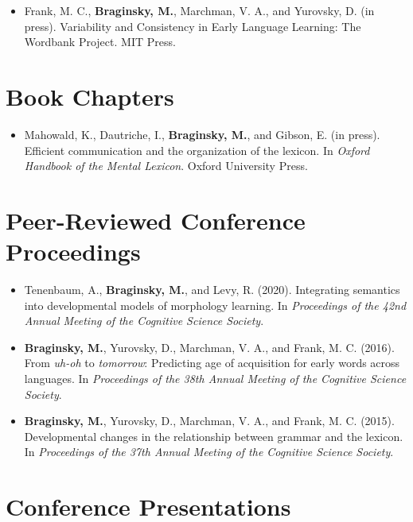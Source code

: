 \documentclass[11pt,]{article}
\providecommand{\tightlist}{%
  \setlength{\itemsep}{0pt}\setlength{\parskip}{0pt}}
\begin{document}
\begin{itemize}
\tightlist
\item
  Frank, M. C., \textbf{Braginsky, M.}, Marchman, V. A., and Yurovsky,
  D. (in press). Variability and Consistency in Early Language Learning:
  The Wordbank Project. MIT Press.
\end{itemize}

\hypertarget{book-chapters}{%
\section{Book Chapters}\label{book-chapters}}

\begin{itemize}
\tightlist
\item
  Mahowald, K., Dautriche, I., \textbf{Braginsky, M.}, and Gibson, E.
  (in press). Efficient communication and the organization of the
  lexicon. In \emph{Oxford Handbook of the Mental Lexicon}. Oxford
  University Press.
\end{itemize}

\hypertarget{peer-reviewed-conference-proceedings}{%
\section{Peer-Reviewed Conference
Proceedings}\label{peer-reviewed-conference-proceedings}}

\begin{itemize}
\item
  Tenenbaum, A., \textbf{Braginsky, M.}, and Levy, R. (2020).
  Integrating semantics into developmental models of morphology
  learning. In \emph{Proceedings of the 42nd Annual Meeting of the
  Cognitive Science Society}.
\item
  \textbf{Braginsky, M.}, Yurovsky, D., Marchman, V. A., and Frank, M.
  C. (2016). From \emph{uh-oh} to \emph{tomorrow}: Predicting age of
  acquisition for early words across languages. In \emph{Proceedings of
  the 38th Annual Meeting of the Cognitive Science Society}.
\item
  \textbf{Braginsky, M.}, Yurovsky, D., Marchman, V. A., and Frank, M.
  C. (2015). Developmental changes in the relationship between grammar
  and the lexicon. In \emph{Proceedings of the 37th Annual Meeting of
  the Cognitive Science Society}.
\end{itemize}

\hypertarget{conference-presentations}{%
\section{Conference Presentations}\label{conference-presentations}}
\end{document}
